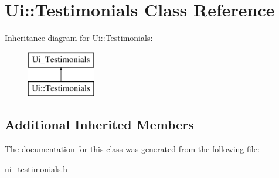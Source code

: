 \hypertarget{class_ui_1_1_testimonials}{}\section{Ui\+:\+:Testimonials Class Reference}
\label{class_ui_1_1_testimonials}
Inheritance diagram for Ui\+:\+:Testimonials\+:\begin{figure}[H]
\begin{center}
\leavevmode
\includegraphics[height=2.000000cm]{class_ui_1_1_testimonials}
\end{center}
\end{figure}
\subsection*{Additional Inherited Members}


The documentation for this class was generated from the following file\+:\begin{DoxyCompactItemize}
\item 
ui\+\_\+testimonials.\+h\end{DoxyCompactItemize}

